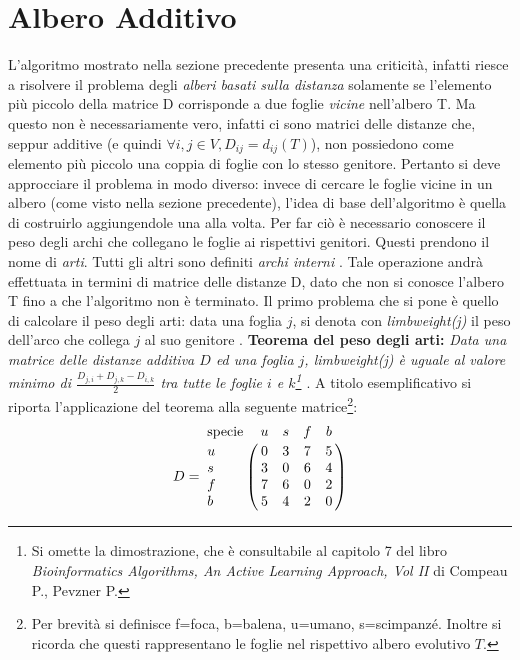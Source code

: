 \section{Albero Additivo}
L'algoritmo mostrato nella sezione precedente presenta una criticità, infatti riesce a risolvere il problema degli \textit{alberi basati sulla distanza} solamente se l'elemento più piccolo della matrice D corrisponde a due foglie \textit{vicine} nell'albero T. Ma questo non è necessariamente vero, infatti ci sono matrici delle distanze che, seppur additive (e quindi $ \forall i,j\in V,D_{ij}=d_{ij}(T)$), non possiedono come elemento più piccolo una coppia di foglie con lo stesso genitore. Pertanto si deve approcciare il problema in modo diverso: invece di cercare le foglie vicine in un albero (come visto nella sezione precedente), l'idea di base dell'algoritmo è quella di costruirlo aggiungendole una alla volta. Per far ciò è necessario conoscere il peso degli archi che collegano le foglie ai rispettivi genitori. Questi prendono il nome di \textit{arti}. Tutti gli altri sono definiti \textit{archi interni} \cite{dataMiningInBioinformatics}. Tale operazione andrà effettuata in termini di matrice delle distanze D, dato che non si conosce l'albero T fino a che l'algoritmo non è terminato.
\newline
Il primo problema che si pone è quello di calcolare il peso degli arti: data una foglia $j$, si denota con \textit{limbweight(j)} il peso dell'arco che collega $j$ al suo genitore \cite{introductionbioinfalg}.
\newline
\newline
\textbf{Teorema del peso degli arti:}
\newline
\textit{Data una matrice delle distanze additiva $D$ ed una foglia $j$, \textit{limbweight(j)} è uguale al valore minimo di $\frac{D_{j,i}+D_{j,k}-D_{i,k}}{2}$ tra tutte le foglie $i$ e $k$\footnote{Si omette la dimostrazione, che è consultabile al capitolo 7 del libro \textit{Bioinformatics Algorithms, An Active Learning Approach, Vol II} di Compeau P., Pevzner P.} \cite{bioinfalganactivelearningapproachparttwo}} .
\newline
\newline
A titolo esemplificativo si riporta l'applicazione del teorema alla seguente matrice\footnote{Per brevità si definisce f=foca, b=balena, u=umano, s=scimpanzé. Inoltre si ricorda che questi rappresentano le foglie nel rispettivo albero evolutivo $T$.}:
\[
D = \bordermatrix{\text{specie}&u&s&f&b\cr
                u& 0 & 3 & 7 & 5\cr
                s& 3 & 0 & 6 & 4\cr
                f& 7 & 6 & 0 & 2\cr
                b& 5 & 4 & 2 & 0}
\]
